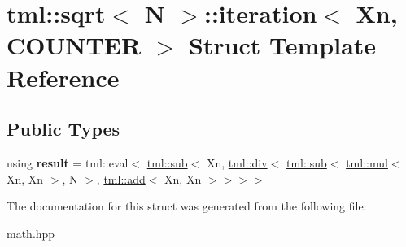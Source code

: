 \hypertarget{structtml_1_1sqrt_1_1iteration}{\section{tml\+:\+:sqrt$<$ N $>$\+:\+:iteration$<$ Xn, C\+O\+U\+N\+T\+E\+R $>$ Struct Template Reference}
\label{structtml_1_1sqrt_1_1iteration}
}
\subsection*{Public Types}
\begin{DoxyCompactItemize}
\item 
\hypertarget{structtml_1_1sqrt_1_1iteration_a2f9482daa576f06b305b65a80943c7c6}{using {\bfseries result} = tml\+::eval$<$ \hyperlink{structtml_1_1sub}{tml\+::sub}$<$ Xn, \hyperlink{structtml_1_1div}{tml\+::div}$<$ \hyperlink{structtml_1_1sub}{tml\+::sub}$<$ \hyperlink{structtml_1_1mul}{tml\+::mul}$<$ Xn, Xn $>$, N $>$, \hyperlink{structtml_1_1add}{tml\+::add}$<$ Xn, Xn $>$$>$$>$$>$}\label{structtml_1_1sqrt_1_1iteration_a2f9482daa576f06b305b65a80943c7c6}

\end{DoxyCompactItemize}


The documentation for this struct was generated from the following file\+:\begin{DoxyCompactItemize}
\item 
math.\+hpp\end{DoxyCompactItemize}
